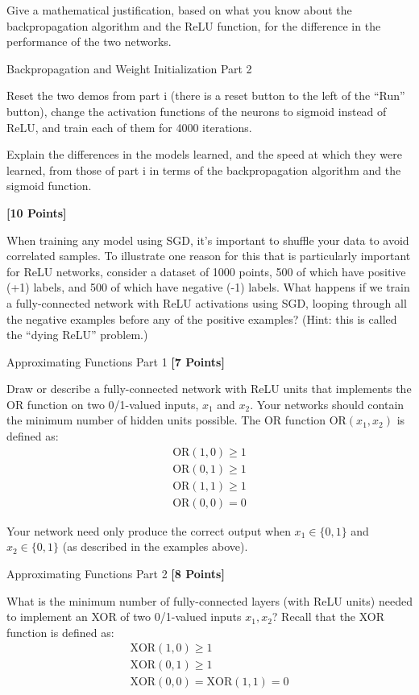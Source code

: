 Give a mathematical justification, based on what you know about the backpropagation algorithm and the ReLU function, for the difference in the performance of the two networks.


\begin{problem}[5]
  Backpropagation and Weight Initialization Part 2
\end{problem}
Reset the two demos from part i (there is a reset button to the left of the ``Run'' button), change the activation functions of the neurons to sigmoid instead of ReLU, and train each of them for 4000 iterations.

Explain the differences in the models learned, and the speed at which they were learned, from those of part i in terms of the backpropagation algorithm and the sigmoid function.



\problem \textbf{[10 Points]}

When training any model using SGD, it's important to shuffle your data to avoid correlated samples. To illustrate one reason for this that is particularly important for ReLU networks, consider a dataset of 1000 points, 500 of which have positive (+1) labels, and 500 of which have negative (-1) labels. What happens if we train a fully-connected network with ReLU activations using SGD, looping through all the negative examples before any of the positive examples? (Hint: this is called the ``dying ReLU'' problem.)


\problem Approximating Functions Part 1 \textbf{[7 Points]}

Draw or describe a fully-connected network with ReLU units that implements the OR function on two 0/1-valued inputs,  $x_1$ and $x_2$.  Your networks should contain the minimum number of hidden units possible.  The OR function $\text{OR}(x_1, x_2)$ is defined as:
\begin{gather*}
\text{OR}(1, 0) \geq 1 \\
\text{OR}(0, 1) \geq 1 \\
\text{OR}(1, 1) \geq 1 \\
\text{OR}(0, 0) = 0
\end{gather*}

Your network need only produce the correct output when $x_1 \in \{0, 1\}$ and $x_2 \in \{0, 1\}$ (as described in the examples above).


\problem Approximating Functions Part 2 \textbf{[8 Points]}

What is the minimum number of fully-connected layers (with ReLU units) needed to implement an XOR of two 0/1-valued inputs $x_1, x_2$? Recall that the XOR function is defined as:
\begin{gather*}
\text{XOR}(1, 0) \geq 1 \\
\text{XOR}(0, 1) \geq 1 \\
\text{XOR}(0, 0) = \text{XOR}(1, 1) = 0
\end{gather*}

